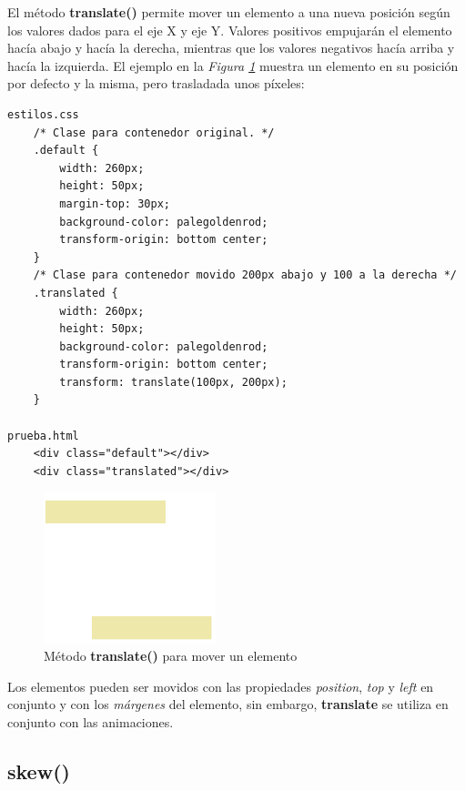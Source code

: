 El método \textbf{translate()} permite mover un elemento a una nueva posición según los valores dados para el eje X y eje Y. Valores positivos empujarán el elemento hacía abajo y hacía la derecha, mientras que los valores negativos hacía arriba y hacía la izquierda. El ejemplo en la \textit{Figura \ref{fig: 54}} muestra un elemento en su posición por defecto y la misma, pero trasladada unos píxeles:
\begin{lstlisting}
estilos.css
    /* Clase para contenedor original. */
    .default {
        width: 260px;
        height: 50px;
        margin-top: 30px;
        background-color: palegoldenrod;
        transform-origin: bottom center; 
    }
    /* Clase para contenedor movido 200px abajo y 100 a la derecha */
    .translated {
        width: 260px;
        height: 50px;
        background-color: palegoldenrod;
        transform-origin: bottom center;
        transform: translate(100px, 200px); 
    }

prueba.html
    <div class="default"></div>
    <div class="translated"></div>
\end{lstlisting}
\begin{figure}[H]
    \centering
    \caption{Método \textbf{translate()} para mover un elemento}
    \label{fig: 54}
    \includegraphics[width=5cm]{ss/translate.png}
\end{figure}

Los elementos pueden ser movidos con las propiedades \textit{position}, \textit{top} y \textit{left} en conjunto y con los \textit{márgenes} del elemento, sin embargo, \textbf{translate} se utiliza en conjunto con las animaciones.


\subsection{skew()}

